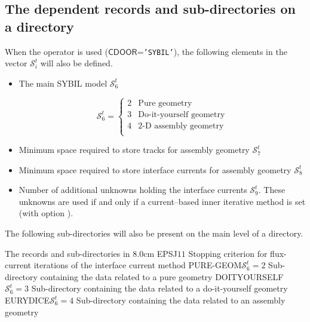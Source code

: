 \subsection{The  dependent records and sub-directories on a
 directory}\label{sect:sybiltrackingdir}

When the  operator is used ($\mathsf{CDOOR}$={\tt 'SYBIL'}), the following elements in the vector
$\mathcal{S}^{t}_{i}$ will also be defined.

\begin{itemize}
\item The main SYBIL model $\mathcal{S}^{t}_{6}$

\begin{displaymath}
\mathcal{S}^{t}_{6} = \left\{
\begin{array}{rl}
 2 & \textrm{Pure geometry} \\
 3 & \textrm{Do-it-yourself geometry} \\
 4 & \textrm{2-D assembly geometry} \\
\end{array} \right.
\end{displaymath}

\item Minimum space required to store tracks for assembly geometry $\mathcal{S}^{t}_{7}$ 

\item Minimum space required to store interface currents for assembly geometry $\mathcal{S}^{t}_{8}$ 

\item Number of additional unknowns holding the interface currents
$\mathcal{S}^{t}_{9}$. These unknowns are used if and only if a current--based
inner iterative method is set (with option ).

\end{itemize}

The following sub-directories will also be present on the main level of a 
directory. 

\begin{DescriptionEnregistrement}{The  records and sub-directories in
}{8.0cm}\label{table:puregeom}
\RealEnr
  {EPSJ}{$1$}{$1$}
  {Stopping criterion for flux-current iterations of the interface current method}
\OptDirEnr
  {PURE-GEOM}{$\mathcal{S}^{t}_{6}=2$}
  {Sub-directory containing the data related to a pure geometry} 
\OptDirEnr
  {DOITYOURSELF}{$\mathcal{S}^{t}_{6}=3$}
  {Sub-directory containing the data related to a do-it-yourself geometry} 
\OptDirEnr
  {EURYDICE}{$\mathcal{S}^{t}_{6}=4$}
  {Sub-directory containing the data related to an assembly geometry} 
\end{DescriptionEnregistrement}

